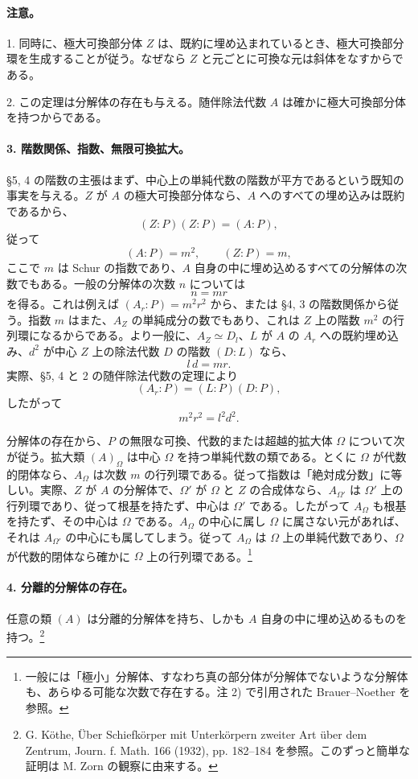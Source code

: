 \paragraph{注意。}
1. 同時に、極大可換部分体 \(Z\) は、既約に埋め込まれているとき、極大可換部分環を生成することが従う。なぜなら \(Z\) と元ごとに可換な元は斜体をなすからである。

2. この定理は分解体の存在も与える。随伴除法代数 \(A\) は確かに極大可換部分体を持つからである。

\paragraph{3. 階数関係、指数、無限可換拡大。}
§5, 4 の階数の主張はまず、中心上の単純代数の階数が平方であるという既知の事実を与える。\(Z\) が \(A\) の極大可換部分体なら、\(A\) へのすべての埋め込みは既約であるから、
\[
        (Z:P)(Z:P)=(A:P),
\]
従って
\[
        (A:P)=m^2,
        \qquad (Z:P)=m,
\]
ここで \(m\) は Schur の指数であり、\(A\) 自身の中に埋め込めるすべての分解体の次数でもある。一般の分解体の次数 \(n\) については
\[
        n=mr
\]
を得る。これは例えば \((A_r:P)=m^2r^2\) から、または §4, 3 の階数関係から従う。指数 \(m\) はまた、\(A_Z\) の単純成分の数でもあり、これは \(Z\) 上の階数 \(m^2\) の行列環になるからである。より一般に、\(A_Z\simeq D_l\)、\(L\) が \(A\) の \(A_r\) への既約埋め込み、\(d^2\) が中心 \(Z\) 上の除法代数 \(D\) の階数 \((D:L)\) なら、
\[
        l\,d=mr .
\]
実際、§5, 4 と 2 の随伴除法代数の定理により
\[
        (A_r:P)=(L:P)(D:P),
\]
したがって
\[
        m^2r^2=l^2d^2 .
\]

分解体の存在から、\(P\) の無限な可換、代数的または超越的拡大体 \(\Omega\) について次が従う。拡大類 \((A)_\Omega\) は中心 \(\Omega\) を持つ単純代数の類である。とくに \(\Omega\) が代数的閉体なら、\(A_\Omega\) は次数 \(m\) の行列環である。従って指数は「絶対成分数」に等しい。実際、\(Z\) が \(A\) の分解体で、\(\Omega'\) が \(\Omega\) と \(Z\) の合成体なら、\(A_{\Omega'}\) は \(\Omega'\) 上の行列環であり、従って根基を持たず、中心は \(\Omega'\) である。したがって \(A_\Omega\) も根基を持たず、その中心は \(\Omega\) である。\(A_\Omega\) の中心に属し \(\Omega\) に属さない元があれば、それは \(A_{\Omega'}\) の中心にも属してしまう。従って \(A_\Omega\) は \(\Omega\) 上の単純代数であり、\(\Omega\) が代数的閉体なら確かに \(\Omega\) 上の行列環である。\footnote{一般には「極小」分解体、すなわち真の部分体が分解体でないような分解体も、あらゆる可能な次数で存在する。注 2) で引用された Brauer--Noether を参照。}

\paragraph{4. 分離的分解体の存在。}
任意の類 \((A)\) は分離的分解体を持ち、しかも \(A\) 自身の中に埋め込めるものを持つ。\footnote{G. Köthe, Über Schiefkörper mit Unterkörpern zweiter Art über dem Zentrum, Journ. f. Math. 166 (1932), pp. 182--184 を参照。このずっと簡単な証明は M. Zorn の観察に由来する。}

